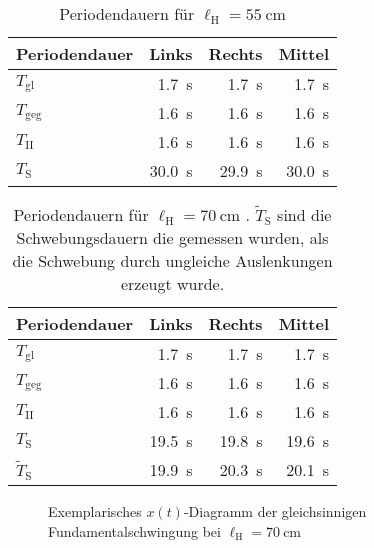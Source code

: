 \documentclass[
12pt,
a4paper,
bibliography=totocnumbered, %
BCOR=1cm, %
oneside, %
]{scrartcl}
\newcommand{\lh}{\ell_{\mathrm{H}}}
\begin{document}
\begin{table}[H]
	\begin{tabular*}{\textwidth}{@{\extracolsep{\fill}}@{\hspace{5pt}}lrrr@{\hspace{5pt}}}
		\toprule
		Periodendauer & Links & Rechts & Mittel\\
		\midrule
		\(T_{\text{gl}}\) & \qty{1,7}{\second} & \qty{1,7}{\second} & \qty{1,7}{\second}\\
		\(T_{\text{geg}}\) & \qty{1,6}{\second} & \qty{1,6}{\second} & \qty{1,6}{\second}\\
		\(T_{\text{II}}\) & \qty{1,6}{\second} & \qty{1,6}{\second} & \qty{1,6}{\second}\\
		\(T_{\text{S}}\) & \qty{30,0}{\second} & \qty{29,9}{\second} & \qty{30,0}{\second} \\
		\bottomrule
	\end{tabular*}
	\caption{Periodendauern für \(\lh = \qty{55}{\centi\meter}\) \label{tbl:res55}}
\end{table}

\begin{table}[H]
	\begin{tabular*}{\textwidth}{@{\extracolsep{\fill}}@{\hspace{5pt}}lrrr@{\hspace{5pt}}}
		\toprule
		Periodendauer & Links & Rechts & Mittel\\
		\midrule
		\(T_{\text{gl}}\) & \qty{1,7}{\second} & \qty{1,7}{\second} & \qty{1,7}{\second}\\
		\(T_{\text{geg}}\) & \qty{1,6}{\second} & \qty{1,6}{\second} & \qty{1,6}{\second}\\
		\(T_{\text{II}}\) & \qty{1,6}{\second} & \qty{1,6}{\second} & \qty{1,6}{\second}\\
		\(T_{\text{S}}\) & \qty{19,5}{\second} & \qty{19,8}{\second} & \qty{19,6}{\second} \\
		\(\tilde{T}_{\text{S}}\) & \qty{19,9}{\second} & \qty{20,3}{\second} & \qty{20,1}{\second}\\
		\bottomrule
	\end{tabular*}
	\caption{Periodendauern für \(\lh = \qty{70}{\centi\meter}\) \label{tbl:res70}. \(\tilde{T}_{\text{S}}\) sind die Schwebungsdauern die gemessen wurden, als die Schwebung durch ungleiche Auslenkungen erzeugt wurde.}
\end{table}


\begin{figure}[H]
	\caption{Exemplarisches \(x(t)\)-Diagramm der gleichsinnigen Fundamentalschwingung bei \(\lh = \qty{70}{\centi\meter}\)}
	\label{fig:gl70}
\end{figure}
\end{document}
